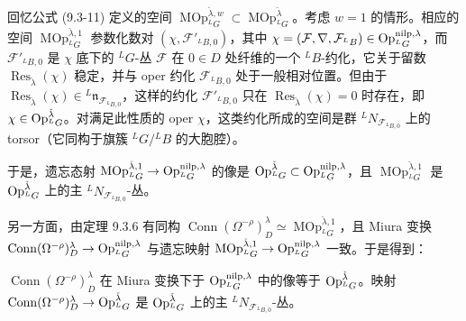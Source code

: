 回忆公式 (9.3-11) 定义的空间 $\operatorname{MOp}^{\check\lambda,w}_{{}^LG}\subset\operatorname{MOp}^{\check\lambda}_{{}^LG}$。考虑 $w=1$ 的情形。相应的空间 $\operatorname{MOp}^{\check\lambda,1}_{{}^LG}$ 参数化数对 $(\chi,\mathcal{F}'_{{}^LB,0})$，其中 $\chi=(\mathcal{F},\nabla,\mathcal{F}_{{}^LB})\in\operatorname{Op}^{\mathrm{nilp},\lambda}_{{}^LG}$，而 $\mathcal{F}'_{{}^LB,0}$ 是 $\chi$ 底下的 ${}^LG$-丛 $\mathcal{F}$ 在 $0\in D$ 处纤维的一个 ${}^LB$-约化，它关于留数 $\operatorname{Res}_{\check\lambda}(\chi)$ 稳定，并与 oper 约化 $\mathcal{F}_{{}^LB,0}$ 处于一般相对位置。但由于 $\operatorname{Res}_{\check\lambda}(\chi)\in{}^L\mathfrak{n}_{\mathcal{F}_{{}^LB,0}}$，这样的约化 $\mathcal{F}'_{{}^LB,0}$ 只在 $\operatorname{Res}_{\check\lambda}(\chi)=0$ 时存在，即 $\chi\in\operatorname{Op}^{\check\lambda}_{{}^LG}$。对满足此性质的 oper $\chi$，这类约化所成的空间是群 ${}^LN_{\mathcal{F}_{{}^LB,0}}$ 上的torsor（它同构于旗簇 ${}^LG/{}^LB$ 的大胞腔）。

于是，遗忘态射 $\operatorname{MOp}^{\check\lambda,1}_{{}^LG}\to\operatorname{Op}^{\mathrm{nilp},\lambda}_{{}^LG}$ 的像是 $\operatorname{Op}^{\check\lambda}_{{}^LG}\subset\operatorname{Op}^{\mathrm{nilp},\lambda}_{{}^LG}$，且 $\operatorname{MOp}^{\check\lambda,1}_{{}^LG}$ 是 $\operatorname{Op}^{\check\lambda}_{{}^LG}$ 上的主 ${}^LN_{\mathcal{F}_{{}^LB,0}}$-丛。

另一方面，由定理 9.3.6 有同构 $\operatorname{Conn}(\Omega^{-\rho})^\lambda_D\simeq\operatorname{MOp}^{\check\lambda,1}_{{}^LG}$，且 Miura 变换 $\operatorname{Conn}(\Omega^{-\rho})^\lambda_D\to\operatorname{Op}^{\mathrm{nilp},\lambda}_{{}^LG}$ 与遗忘映射 $\operatorname{MOp}^{\check\lambda,1}_{{}^LG}\to\operatorname{Op}^{\mathrm{nilp},\lambda}_{{}^LG}$ 一致。于是得到：

\begin{lemma}
    $\operatorname{Conn}(\Omega^{-\rho})^\lambda_D$ 在 Miura 变换下于 $\operatorname{Op}^{\mathrm{nilp},\lambda}_{{}^LG}$ 中的像等于 $\operatorname{Op}^{\check\lambda}_{{}^LG}$。映射 $\operatorname{Conn}(\Omega^{-\rho})^\lambda_D\to\operatorname{Op}^{\check\lambda}_{{}^LG}$ 是 $\operatorname{Op}^{\check\lambda}_{{}^LG}$ 上的主 ${}^LN_{\mathcal{F}_{{}^LB,0}}$-丛。
\end{lemma}

